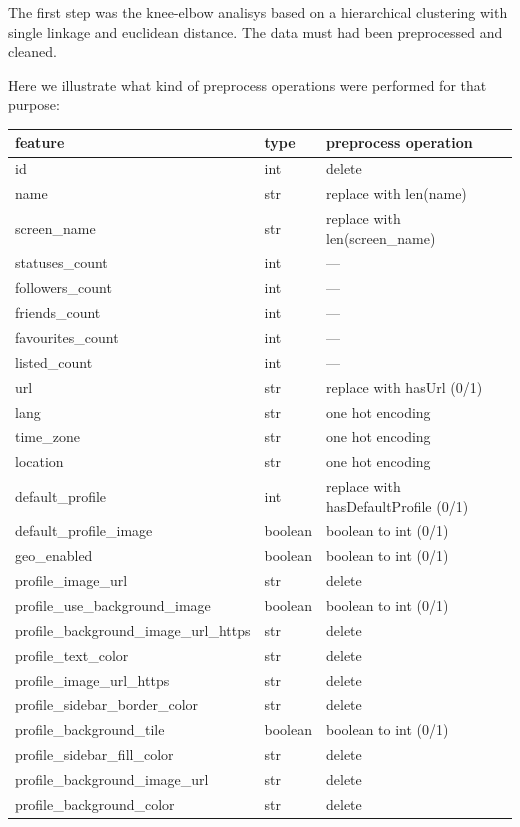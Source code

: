 The first step was the knee-elbow analisys based on a hierarchical clustering with single linkage and euclidean distance. The data must had been preprocessed and cleaned.

Here we illustrate what kind of preprocess operations were performed for that purpose:

\small
\begin{center}
	\begin{tabular}{lll}
		\\feature&type&preprocess operation\\
		\hline\hline
		id&int&delete\\
		name&str&replace with len(name)\\
		screen\_name&str&replace with len(screen\_name)\\
		statuses\_count&int&---\\
		followers\_count&int&---\\
		friends\_count&int&---\\
		favourites\_count&int&---\\
		listed\_count&int&---\\
		url&str&replace with hasUrl (0/1)\\
		lang&str&one hot encoding\\
		time\_zone&str&one hot encoding\\
		location&str&one hot encoding\\
		default\_profile&int&replace with hasDefaultProfile (0/1)\\
		default\_profile\_image&boolean&boolean to int (0/1)\\
		geo\_enabled&boolean&boolean to int (0/1)\\
		profile\_image\_url&str&delete\\
		profile\_use\_background\_image&boolean&boolean to int (0/1)\\
		profile\_background\_image\_url\_https&str&delete\\
		profile\_text\_color&str&delete\\
		profile\_image\_url\_https&str&delete\\
		profile\_sidebar\_border\_color&str&delete\\
		profile\_background\_tile&boolean&boolean to int (0/1)\\
		profile\_sidebar\_fill\_color&str&delete\\
		profile\_background\_image\_url&str&delete\\
		profile\_background\_color&str&delete\\

\end{tabular}
\end{center}
